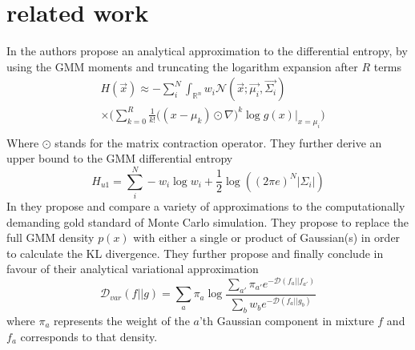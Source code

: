 \documentclass[journal]{IEEEtran}
\begin{document}
\section{related work}
In \cite{huber2008entropy} the authors propose an analytical approximation to the differential entropy, by using the GMM moments and truncating the logarithm expansion after $R$ terms
\begin{equation}
\begin{aligned}
& H(\vec{x}) \approx  -\sum_{i}^{N}\int_{\mathbb{R}^{n}}w_{i}\mathcal{N}(\vec{x};\vec{\mu_{i}},\vec{\Sigma_{i}})\\
& \times \biggr(\sum_{k=0}^{R}\frac{1}{k!}\bigg((x-\mu_{k})\odot\nabla\bigg)^{k}\log g(x)\bigg\rvert_{x=\mu_{i}}\biggr)\\
\end{aligned}
\end{equation}
Where $\odot$ stands for the matrix contraction operator. They further derive an upper bound to the GMM differential entropy
\begin{equation}
H_{u1} = \sum_{i}^{N}-w_{i}\log w_{i} + \frac{1}{2}\log((2\pi e)^{N}|\Sigma_{i}|)
\end{equation}
In \cite{hershey2007approximating} they propose and compare a variety of approximations to the computationally demanding gold standard of Monte Carlo simulation. They propose to replace the full GMM density $p(x)$ with either a single or product of Gaussian(s) in order to calculate the KL divergence. They further propose and finally conclude in favour of their analytical variational approximation
\begin{equation}
\mathcal{D}_{var}(f||g) = \sum_{a}\pi_{a}\log \frac{\sum_{a'}\pi_{a'}e^{-\mathcal{D}(f_{a}||f_{a'})}}{\sum_{b}w_{b}e^{-\mathcal{D}(f_{a}||g_{b})}} 
\end{equation}
where $\pi_{a}$ represents the weight of the $a$'th Gaussian component in mixture $f$ and $f_{a}$ corresponds to that density. {\color{red}{check this}}
\end{document}
